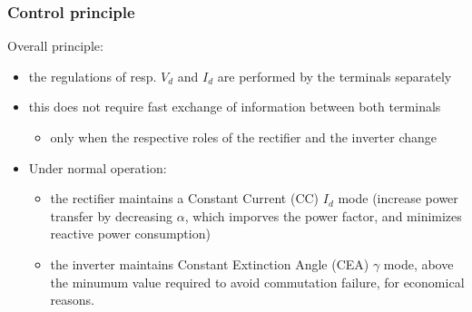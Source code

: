 \begin{frame}
\frametitle{Control principle}
Overall principle:
\begin{itemize}
    \item the regulations of resp. $V_d$ and $I_d$ are performed by the terminals separately
    \item this does not require fast exchange of information between both terminals
    \begin{itemize}
        \item only when the respective roles of the rectifier and the inverter change
    \end{itemize}
    \item Under normal operation:
    \begin{itemize}
        \item the rectifier maintains a Constant Current (CC) $I_d$ mode (increase power transfer by decreasing $\alpha$, which imporves the power factor, and minimizes reactive power consumption)
        \item the inverter maintains Constant Extinction Angle (CEA) $\gamma$ mode, above the minumum value required to avoid commutation failure, for economical reasons.
    \end{itemize}
\end{itemize}
\end{frame}

